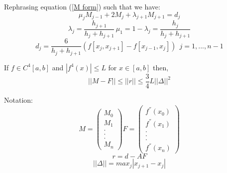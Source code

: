 Rephrasing equation (\ref{M form}) such that we have:
\[\mu_jM_{j-1} +2M_j +\lambda_{j+1}M_{j+1} = d_j \]
\[ \lambda_j = \frac{h_{j+1}}{h_{j}+h_{j+1}} \, \mu_1=1-\lambda_j=\frac{h_j}{h_j+h_{j+1}} \]
\[d_j = \frac{6}{h_j+h_{j+1}}\left(f[x_{j},x_{j+1}]-f[x_{j-1},x_{j}]\right) \ \
j=1,...,n-1 \]
\begin{theorem}
If $f\in C^{4}[a,b]$ and $|f^{4}(x)|\leq L$ for $x \in [a,b]$ then,
\[
||M-F||\leq ||r|| \leq \frac{3}{4}L||\Delta||^{2} \]
\end{theorem}
Notation:
\[
M=\left( \begin{array}{c}
      M_0\\
      M_1\\
      .\\
      .\\
      .\\
      M_n\end{array} \right)
F=
\left( \begin{array}{c}
      f^{''}(x_0)\\
      f^{''}(x_1)\\
      .\\
      .\\
      .\\
      f^{''}(x_n)\end{array} \right)
\]
\[r=d-AF \]
\[||\Delta||=max_j|x_{j+1}-x_{j}| \]

